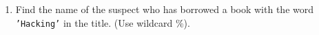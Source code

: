 \documentclass[12pt,a4paper]{article}
\begin{document}
\begin{enumerate}






    \item Find the name of the suspect who has borrowed a book with the word \texttt{'Hacking'} in the title. (Use wildcard \%).



\end{enumerate}
\end{document}
